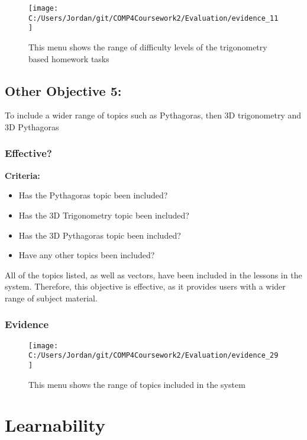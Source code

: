 \begin{figure}[H]
	\texttt{[image: C:/Users/Jordan/git/COMP4Coursework2/Evaluation/evidence\_11]}
	\caption{This menu shows the range of difficulty levels of the trigonometry based homework tasks}
\end{figure}

\subsection{Other Objective 5: }

To include a wider range of topics such as Pythagoras, then 3D trigonometry and 3D Pythagoras

\subsubsection{Effective?}

\textbf{Criteria: }

\begin{itemize}
	\item Has the Pythagoras topic been included?
	\item Has the 3D Trigonometry topic been included?
	\item Has the 3D Pythagoras topic been included?
	\item Have any other topics been included?
\end{itemize}

All of the topics listed, as well as vectors, have been included in the lessons in the system. Therefore, this objective is effective, as it provides users with a wider range of subject material.

\subsubsection{Evidence}

\begin{figure}[H]
	\texttt{[image: C:/Users/Jordan/git/COMP4Coursework2/Evaluation/evidence\_29]}
	\caption{This menu shows the range of topics included in the system}
\end{figure}

\section{Learnability}

